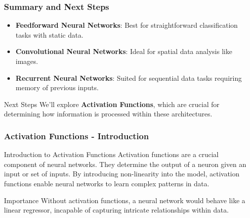 \documentclass[aspectratio=169]{beamer}
\begin{document}
\begin{frame}[fragile]
    \frametitle{Summary and Next Steps}
    \begin{itemize}
        \item \textbf{Feedforward Neural Networks}: Best for straightforward classification tasks with static data.
        \item \textbf{Convolutional Neural Networks}: Ideal for spatial data analysis like images.
        \item \textbf{Recurrent Neural Networks}: Suited for sequential data tasks requiring memory of previous inputs.
    \end{itemize}

    \begin{block}{Next Steps}
        We'll explore \textbf{Activation Functions}, which are crucial for determining how information is processed within these architectures.
    \end{block}
\end{frame}

\begin{frame}[fragile]
    \frametitle{Activation Functions - Introduction}
    \begin{block}{Introduction to Activation Functions}
        Activation functions are a crucial component of neural networks. They determine the output of a neuron given an input or set of inputs. By introducing non-linearity into the model, activation functions enable neural networks to learn complex patterns in data.
    \end{block}
    \begin{block}{Importance}
        Without activation functions, a neural network would behave like a linear regressor, incapable of capturing intricate relationships within data.
    \end{block}
\end{frame}
\end{document}
